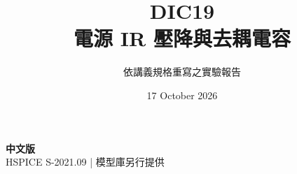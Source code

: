 \documentclass[11pt,a4paper]{article}
\title{\color{accent}DIC19\\[4pt]電源 IR 壓降與去耦電容}
\author{依講義規格重寫之實驗報告}
\date{17 October 2026}
\begin{document}
\maketitle
\begin{center}\small\textbf{中文版}\\
HSPICE S-2021.09 \quad | \quad 模型庫另行提供
\end{center}


\end{document}
